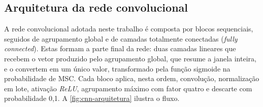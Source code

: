 
\subsection{Arquitetura da rede convolucional}
\label{subsec:fund-cnn-arquitetura}

A rede convolucional adotada neste trabalho é composta por blocos
sequenciais, seguidos de agrupamento global e de camadas totalmente conectadas
(\textit{fully connected}). Estas formam a parte final da rede: duas camadas
lineares que recebem o vetor produzido pelo agrupamento global, que resume
a janela inteira, e o convertem em um único valor, transformado pela função
sigmoide na probabilidade de \gls{MSC}. Cada bloco aplica, nesta ordem, convolução, normalização em lote,
ativação \textit{ReLU}, agrupamento máximo com fator quatro e descarte com
probabilidade 0,1. A \autoref{fig:cnn-arquitetura} ilustra o fluxo.


